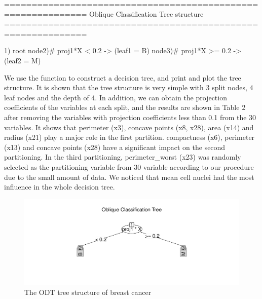 \documentclass[nojss]{jss}
\newcommand{\fct}[1]{\code{#1()}}
\numberwithin{equation}{section}
\begin{document}
\begin{Schunk}
\begin{Soutput}
============================================================= 
Oblique Classification Tree structure 
=============================================================

1) root
   node2)# proj1*X < 0.2 -> (leaf1 = B)
   node3)# proj1*X >= 0.2 -> (leaf2 = M)
\end{Soutput}
\end{Schunk}
We use the function \fct{ODT} to construct a decision tree, and print and plot the tree structure. It is shown that the tree structure is very simple with 3 split nodes, 4 leaf nodes and the depth of 4. In addition, we can obtain the projection coefficients of the variables at each split, and the results are shown in Table 2 after removing the variables with projection coefficients less than 0.1 from the 30 variables. It shows that perimeter (x3), concave points (x8, x28), area (x14) and radius (x21) play a major role in the first partition. compactness (x6), perimeter (x13) and concave points (x28) have a significant impact on the second partitioning. In the third partitioning, perimeter\_worst (x23) was randomly selected as the partitioning variable from 30 variable according to our procedure due to the small amount of data. We noticed that mean cell nuclei had the most influence in the whole decision tree.
\begin{figure}[t!]
\centering
\includegraphics{ODRF-tree}
\caption{\label{fig:cancer.tree} The ODT tree structure of breast cancer}
\end{figure}
\end{document}
